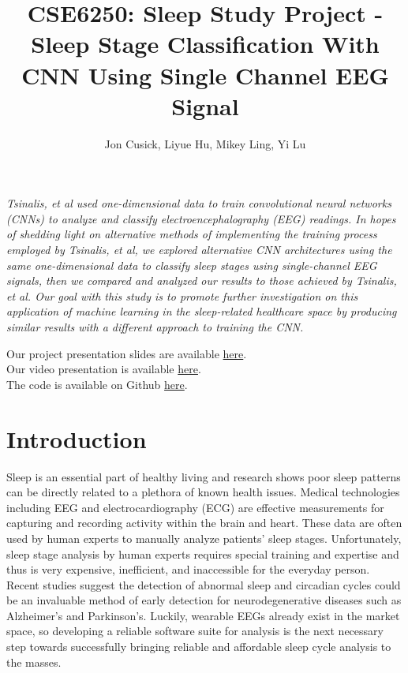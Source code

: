 \documentclass{amia}
\begin{document}
\title{CSE6250: Sleep Study Project - Sleep Stage Classification With CNN Using Single Channel EEG Signal}

\author{Jon Cusick, Liyue Hu, Mikey Ling, Yi Lu}


\maketitle


\textit{Tsinalis, et al used one-dimensional data to train convolutional neural networks (CNNs) to analyze and classify electroencephalography (EEG) readings\cite{ref_Tsinalis2016}. In hopes of shedding light on alternative methods of implementing the training process employed by Tsinalis, et al, we explored alternative CNN architectures using the same one-dimensional data to classify sleep stages using single-channel EEG signals, then we compared and analyzed our results to those achieved by Tsinalis, et al. Our goal with this study is to promote further investigation on this application of machine learning in the sleep-related healthcare space by producing similar results with a different approach to training the CNN.}

Our project presentation slides are available \href{https://drive.google.com/file/d/1RqdS4do9p3dJwOhbPj-ZyiP3g_MoO3QA/view?usp=sharing}{here}.\\
Our video presentation is available \href{https://youtu.be/gYVlDitM5-Ey}{here}. \\
The code is available on Github \href{https://github.gatech.edu/jcusick7/cse6250-sleep-study}{here}. 

\section*{Introduction}
Sleep is an essential part of healthy living and research shows poor sleep patterns can be directly related to a plethora of known health issues\cite{ref_Wulff2010}. Medical technologies including EEG and electrocardiography (ECG) are effective measurements for capturing and recording activity within the brain and heart. These data are often used by human experts to manually analyze patients' sleep stages. Unfortunately, sleep stage analysis by human experts requires special training and expertise and thus is very expensive, inefficient, and inaccessible for the everyday person. Recent studies suggest the detection of abnormal sleep and circadian cycles could be an invaluable method of early detection for neurodegenerative diseases such as Alzheimer's and Parkinson's\cite{ref_Wulff2010}. Luckily, wearable EEGs already exist in the market space, so developing a reliable software suite for analysis is the next necessary step towards successfully bringing reliable and affordable sleep cycle analysis to the masses.
\end{document}
